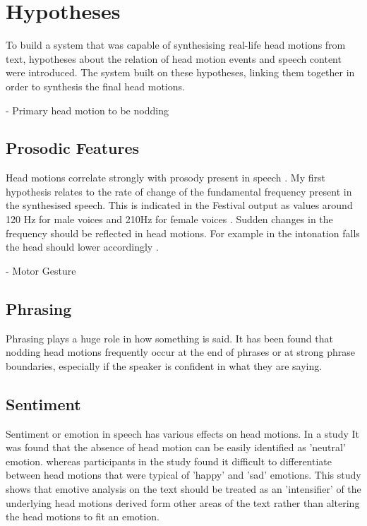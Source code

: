 \documentclass[bsc,frontabs,twoside,singlespacing,parskip]{infthesis}
\begin{document}
\section{Hypotheses}

To build a system that was capable of synthesising real-life head motions from text, hypotheses about the relation of head motion events and speech content were introduced. The system built on these hypotheses, linking them together in order to synthesis the final head motions. 

\cite{first_paper} 
- Primary head motion to be nodding \\

\subsection{Prosodic Features}

Head motions correlate strongly with prosody present in speech \cite{vis_prosody}. My first hypothesis relates to the rate of change of the fundamental frequency present in the synthesised speech. This is indicated in the Festival output as values around 120 Hz for male voices and 210Hz for female voices \cite{f0_values}. Sudden changes in the frequency should be reflected in head motions. For example in the intonation falls the head should lower accordingly \cite{Kendon}.

- Motor Gesture \\

\subsection{Phrasing}

Phrasing plays a huge role in how something is said. It has been found that nodding head motions frequently occur at the end of phrases or at strong phrase boundaries, especially if the speaker is confident in what they are saying. \cite{ishi2008}  

\subsection{Sentiment}

Sentiment or emotion in speech has various effects on head motions. In a study It was found that the absence of head motion can be easily identified as 'neutral' emotion. \cite{emotion_head_motion} whereas participants in the study found it difficult to differentiate between head motions that were typical of 'happy' and 'sad' emotions. This study shows that emotive analysis on the text should be treated as an 'intensifier' of the underlying head motions derived form other areas of the text rather than altering the head motions to fit an emotion.
\end{document}
